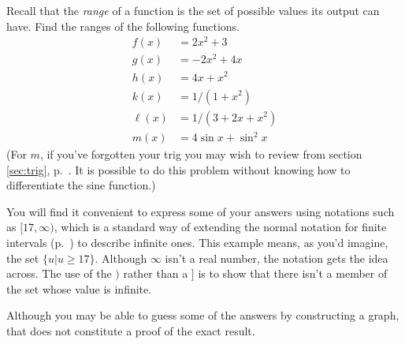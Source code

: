 Recall that the \emph{range} of a function is the set of possible values its
output can have.
Find the ranges of the following functions.
\begin{align*}
  f(x) &= 2x^2+3 \\
  g(x) &= -2x^2+4x \\
  h(x) &= 4x +x^2\\
  k(x) &= 1/(1+x^2)\\
  \ell(x) &= 1/(3+2x+x^2)\\
  m(x) &= 4\sin x + \sin^2 x 
\end{align*}
(For $m$, if you've forgotten your trig you may wish to review
from section \ref{sec:trig}, p.~\pageref{sec:trig}. It is possible
to do this problem without knowing how to differentiate the sine
function.)

You will find it convenient to express some of your answers using
notations such as $[17,\infty)$, which is a standard way of extending
the normal notation for finite intervals (p.~\pageref{interval-notation})
to describe infinite ones. This example means, as you'd
imagine, the set $\{u|u\ge 17\}$. Although $\infty$ isn't
a real number, the notation gets the idea across. The use of the $)$
rather than a $]$ is to show that there isn't a member of the set
whose value is infinite.

Although you may be able to guess some of the answers by constructing
a graph, that does not constitute a proof of the exact result.
